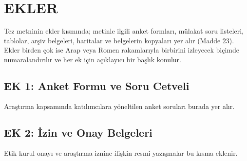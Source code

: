 \chapter*{EKLER}

Tez metninin ekler kısmında; metinle ilgili anket formları, mülakat soru listeleri, tablolar, arşiv belgeleri, haritalar ve belgelerin kopyaları yer alır (Madde 23). Ekler birden çok ise Arap veya Romen rakamlarıyla birbirini izleyecek biçimde numaralandırılır ve her ek için açıklayıcı bir başlık konulur.

\section*{EK 1: Anket Formu ve Soru Cetveli}
Araştırma kapsamında katılımcılara yöneltilen anket soruları burada yer alır.

\vspace{1cm}

\section*{EK 2: İzin ve Onay Belgeleri}
Etik kurul onayı ve araştırma iznine ilişkin resmi yazışmalar bu kısma eklenir.